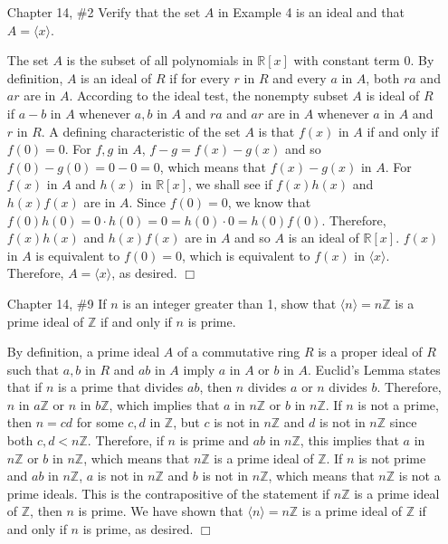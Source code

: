 \documentclass{article}
\newcommand{\Z}{\mathbb Z}
\newcommand{\R}{\mathbb R}
\begin{document}
\begin{enumerate}
    \item[Chapter 14, \#2] Verify that the set $A$ in Example 4 is an ideal and that $A = \langle x \rangle$.
    
    \begin{flushleft}
    The set $A$ is the subset of all polynomials in $\R[x]$ with constant term 0. By definition, $A$ is an ideal of $R$ if for every $r $ in $ R$ and every $a $ in $ A$, both $ra$ and $ar$ are in $A$. According to the ideal test, the nonempty subset $A$ is ideal of $R$ if $a-b $ in $ A$ whenever $a, b $ in $ A$ and $ra$ and $ar$ are in $A$ whenever $a $ in $ A$ and $r $ in $ R$. A defining characteristic of the set $A$ is that $f(x) $ in $ A$ if and only if $f(0) = 0$. For $f, g $ in $ A$, $f-g = f(x) - g(x)$ and so $f(0) - g(0) = 0 - 0 = 0$, which means that $f(x) - g(x) $ in $ A$. For $f(x) $ in $ A$ and $h(x) $ in $ \R[x]$, we shall see if $f(x)h(x)$ and $h(x)f(x)$ are in $A$. Since $f(0) = 0$, we know that $f(0)h(0) = 0 \cdot h(0) = 0 = h(0) \cdot 0 = h(0)f(0)$. Therefore, $f(x)h(x)$ and $h(x)f(x)$ are in $A$ and so $A$ is an ideal of $\R[x]$. $f(x) $ in $ A$ is equivalent to $f(0) = 0$, which is equivalent to $f(x) $ in $ \langle x \rangle$. Therefore, $A = \langle x \rangle$, as desired. $\Box$
    \end{flushleft}
    
    \item[Chapter 14, \#9] If $n$ is an integer greater than 1, show that $\langle n \rangle = n\Z$ is a prime ideal of $\Z$ if and only if $n$ is prime.
    
    \begin{flushleft}
     By definition, a prime ideal $A$ of a commutative ring $R$ is a proper ideal of $R$ such that $a, b $ in $ R$ and $ab $ in $ A$ imply $a $ in $ A$ or $b $ in $ A$. Euclid's Lemma states that if $n$ is a prime that divides $ab$, then $n$ divides $a$ or $n$ divides $b$. Therefore, $n $ in $ a\Z$ or $n $ in $ b\Z$, which implies that $a $ in $ n\Z$ or $b $ in $ n\Z$. If $n$ is not a prime, then $n = cd$ for some $c, d $ in $ \Z$, but $c $ is not in $ n\Z$ and $d $ is not in $ n\Z$ since both $c, d < n\Z$. Therefore, if $n$ is prime and $ab $ in $ n\Z$, this implies that $a $ in $ n\Z$ or $b $ in $ n\Z$, which means that $n\Z$ is a prime ideal of $\Z$. If $n$ is not prime and $ab $ in $ n\Z$, $a $ is not in $ n\Z$ and $b $ is not in $ n\Z$, which means that $n\Z$ is not a prime ideals. This is the contrapositive of the statement if $n\Z$ is a prime ideal of $\Z$, then $n$ is prime. We have shown that $\langle n \rangle = n\Z$ is a prime ideal of $\Z$ if and only if $n$ is prime, as desired. $\Box$ 
    \end{flushleft}
    

\end{enumerate}
\end{document}
